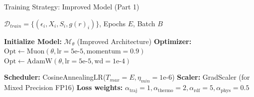 \documentclass[aspectratio=169, 10pt]{beamer}
\begin{document}
\begin{frame}[fragile]{Training Strategy: Improved Model (Part 1)}
    \centering
    \footnotesize
    \begin{algorithm}[H]
        \caption*{Physics-Informed Training Loop (Initialization)}
        \footnotesize
        \begin{algorithmic}[1]
            \footnotesize
            \Require $\mathcal{D}_{train} = \{(\epsilon_i, X_i, S_i, g(r)_i)\}$, Epochs $E$, Batch $B$
            
            \State \textbf{Initialize Model:} $\mathcal{M}_{\theta}$ (Improved Architecture)
            \State \textbf{Optimizer:} 
                \State $\text{Opt} \leftarrow \text{Muon}(\theta, \text{lr}=5\text{e-}5, \text{momentum}=0.9)$ 
            \Else
                \State $\text{Opt} \leftarrow \text{AdamW}(\theta, \text{lr}=5\text{e-}5, \text{wd}=1\text{e-}4)$ 
            \EndIf
            
            \State \textbf{Scheduler:} CosineAnnealingLR($T_{max}=E, \eta_{min}=1\text{e-}6$) 
            \State \textbf{Scaler:} GradScaler (for Mixed Precision FP16)
            \State \textbf{Loss weights:} $\alpha_{\text{traj}}=1, \alpha_{\text{thermo}}=2, \alpha_{\text{rdf}}=5, \alpha_{\text{phys}}=0.5$
            
            \Statex \hrulefill
        \end{algorithmic}
    \end{algorithm}
\end{frame}
\end{document}
